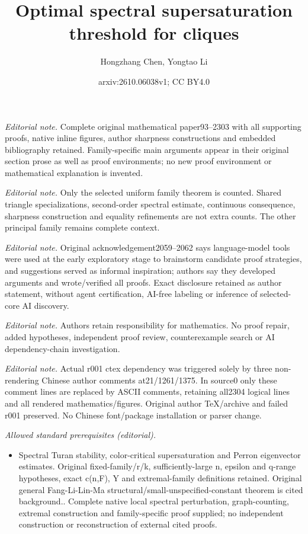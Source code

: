 \documentclass[11pt,a4paper]{article}
\title{Optimal spectral supersaturation threshold for cliques}
\author{Hongzhang Chen, Yongtao Li}
\date{arxiv:2610.06038v1; CC BY4.0}
\theoremstyle{definition}
\theoremstyle{plain}
\begin{document}
\maketitle
\noindent\textit{Editorial note.} Complete original mathematical paper93--2303 with all supporting proofs, native inline figures, author sharpness constructions and embedded bibliography retained. Family-specific main arguments appear in their original section prose as well as proof environments; no new proof environment or mathematical explanation is invented.\par\medskip
\noindent\textit{Editorial note.} Only the selected uniform family theorem is counted. Shared triangle specializations, second-order spectral estimate, continuous consequence, sharpness construction and equality refinements are not extra counts. The other principal family remains complete context.\par\medskip
\noindent\textit{Editorial note.} Original acknowledgement2059--2062 says language-model tools were used at the early exploratory stage to brainstorm candidate proof strategies, and suggestions served as informal inspiration; authors say they developed arguments and wrote/verified all proofs. Exact disclosure retained as author statement, without agent certification, AI-free labeling or inference of selected-core AI discovery.\par\medskip
\noindent\textit{Editorial note.} Authors retain responsibility for mathematics. No proof repair, added hypotheses, independent proof review, counterexample search or AI dependency-chain investigation.\par\medskip
\noindent\textit{Editorial note.} Actual r001 ctex dependency was triggered solely by three non-rendering Chinese author comments at21/1261/1375. In source0 only these comment lines are replaced by ASCII comments, retaining all2304 logical lines and all rendered mathematics/figures. Original author TeX/archive and failed r001 preserved. No Chinese font/package installation or parser change.\par\medskip
\noindent\textit{Allowed standard prerequisites (editorial).}\begin{itemize}
\item Spectral Turan stability, color-critical supersaturation and Perron eigenvector estimates. Original fixed-family/r/k, sufficiently-large n, epsilon and q-range hypotheses, exact c(n,F), Y and extremal-family definitions retained. Original general Fang-Li-Lin-Ma structural/small-unspecified-constant theorem is cited background.. Complete native local spectral perturbation, graph-counting, extremal construction and family-specific proof supplied; no independent construction or reconstruction of external cited proofs.
\end{itemize}\medskip
\end{document}

